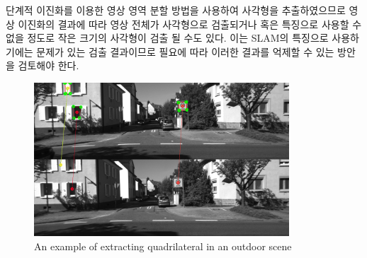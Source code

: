 \documentclass[master,korean,final]{cbnu-ecs}
\begin{document}
단계적 이진화를 이용한 영상 영역 분할 방법을 사용하여 사각형을 추출하였으므로 영상 이진화의 결과에 따라 영상 전체가 사각형으로 검출되거나 혹은 특징으로 사용할 수 없을 정도로 작은 크기의 사각형이 검출 될 수도 있다. 이는 SLAM의 특징으로 사용하기에는 문제가 있는 검출 결과이므로 필요에 따라 이러한 결과를 억제할 수 있는 방안을 검토해야 한다.
\begin{figure}[!ht]
  \centering
	\includegraphics[width=360px]{img/rect_seg.png}
  \caption{An example of extracting quadrilateral in an outdoor scene }
\label{segment_example}
\end{figure}
\end{document}
